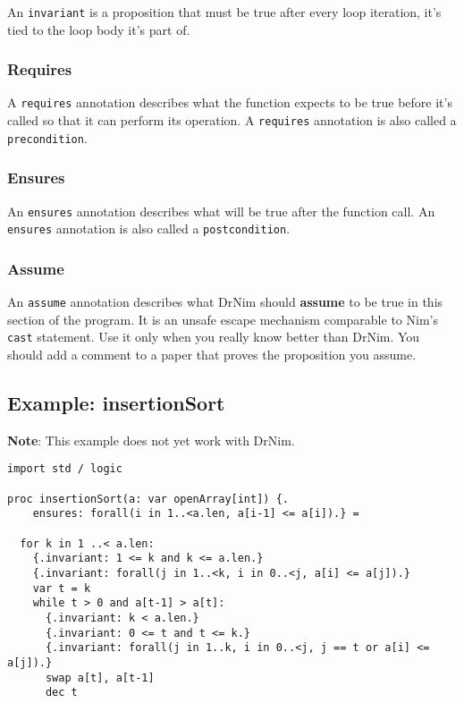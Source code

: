 An \texttt{invariant} is a proposition that must be true after every
loop iteration, it's tied to the loop body it's part of.

\hypertarget{requires}{%
\subsubsection{Requires}\label{requires}}

A \texttt{requires} annotation describes what the function expects to be
true before it's called so that it can perform its operation. A
\texttt{requires} annotation is also called a \texttt{precondition}.

\hypertarget{ensures}{%
\subsubsection{Ensures}\label{ensures}}

An \texttt{ensures} annotation describes what will be true after the
function call. An \texttt{ensures} annotation is also called a
\texttt{postcondition}.

\hypertarget{assume}{%
\subsubsection{Assume}\label{assume}}

An \texttt{assume} annotation describes what DrNim should
\textbf{assume} to be true in this section of the program. It is an
unsafe escape mechanism comparable to Nim's \texttt{cast} statement. Use
it only when you really know better than DrNim. You should add a comment
to a paper that proves the proposition you assume.

\hypertarget{example-insertionsort}{%
\subsection{Example: insertionSort}\label{example-insertionsort}}

\textbf{Note}: This example does not yet work with DrNim.

\begin{verbatim}
import std / logic

proc insertionSort(a: var openArray[int]) {.
    ensures: forall(i in 1..<a.len, a[i-1] <= a[i]).} =

  for k in 1 ..< a.len:
    {.invariant: 1 <= k and k <= a.len.}
    {.invariant: forall(j in 1..<k, i in 0..<j, a[i] <= a[j]).}
    var t = k
    while t > 0 and a[t-1] > a[t]:
      {.invariant: k < a.len.}
      {.invariant: 0 <= t and t <= k.}
      {.invariant: forall(j in 1..k, i in 0..<j, j == t or a[i] <= a[j]).}
      swap a[t], a[t-1]
      dec t
\end{verbatim}

